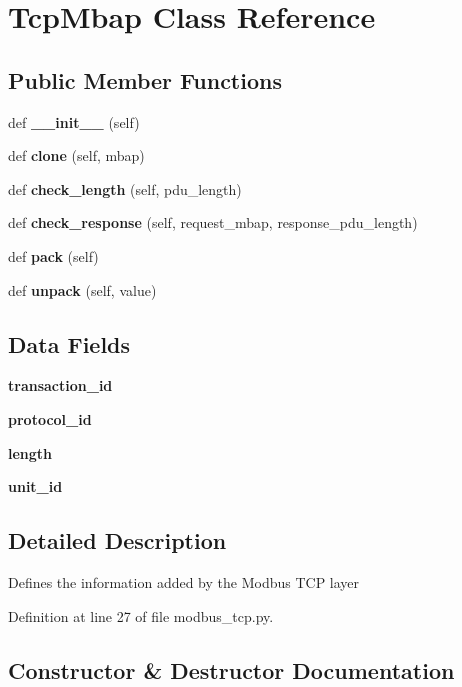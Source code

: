 \section{Tcp\+Mbap Class Reference}
\label{classprotolibs_1_1modbus__tk_1_1modbus__tcp_1_1_tcp_mbap}
\subsection*{Public Member Functions}
\begin{DoxyCompactItemize}
\item 
def {\bf \+\_\+\+\_\+init\+\_\+\+\_\+} (self)
\item 
def {\bf clone} (self, mbap)
\item 
def {\bf check\+\_\+length} (self, pdu\+\_\+length)
\item 
def {\bf check\+\_\+response} (self, request\+\_\+mbap, response\+\_\+pdu\+\_\+length)
\item 
def {\bf pack} (self)
\item 
def {\bf unpack} (self, value)
\end{DoxyCompactItemize}
\subsection*{Data Fields}
\begin{DoxyCompactItemize}
\item 
{\bf transaction\+\_\+id}
\item 
{\bf protocol\+\_\+id}
\item 
{\bf length}
\item 
{\bf unit\+\_\+id}
\end{DoxyCompactItemize}


\subsection{Detailed Description}
\begin{DoxyVerb}Defines the information added by the Modbus TCP layer\end{DoxyVerb}
 

Definition at line 27 of file modbus\+\_\+tcp.\+py.



\subsection{Constructor \& Destructor Documentation}

